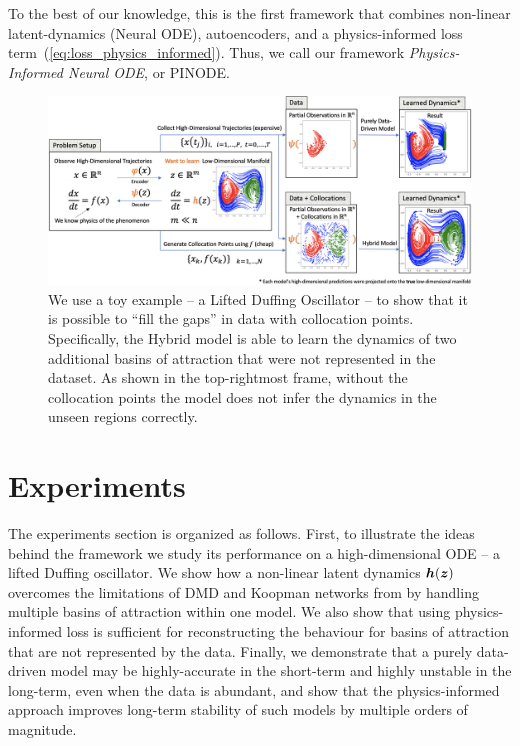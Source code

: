 To the best of our knowledge, this is the first framework that combines non-linear latent-dynamics (Neural ODE), autoencoders, and a physics-informed loss term~(\ref{eq:loss_physics_informed}). Thus, we call our framework \textit{Physics-Informed Neural ODE}, or PINODE. 
\begin{figure}[t]
    \centering
    \includegraphics[width=\textwidth]{figures/duff_first_exp_abstract.png}
    \caption{We use a toy example -- a Lifted Duffing Oscillator -- to show that it is possible to ``fill the gaps'' in data with collocation points. Specifically, the Hybrid model is able to learn the dynamics of two additional basins of attraction that were not represented in the dataset. As shown in the top-rightmost frame, without the collocation points the model does not infer the dynamics in the unseen regions correctly.}
    \label{fig:duffing_pinode}
\end{figure}

\section{Experiments}
\label{sec:exp}
The experiments section is organized as follows. First, to illustrate the ideas behind the framework we study its performance on a high-dimensional ODE -- a lifted Duffing oscillator. We show how a non-linear latent dynamics $\boldsymbol{h}(\boldsymbol{z})$ overcomes the limitations of DMD and Koopman networks from \citep{liu2022physics} by handling multiple basins of attraction within one model. We also show that using physics-informed loss is sufficient for reconstructing the behaviour for basins of attraction that are not represented by the data. Finally, we demonstrate that a purely data-driven model may be highly-accurate in the short-term and highly unstable in the long-term, even when the data is abundant, and show that the physics-informed approach improves long-term stability of such models by multiple orders of magnitude.

